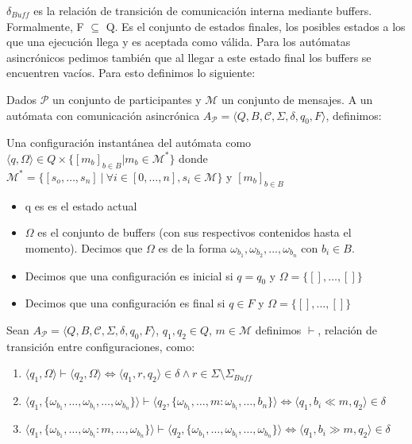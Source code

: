 $\delta_{Buff}$ es la relación de transición de comunicación interna mediante buffers.\\

Formalmente, F $\subseteq$ Q. Es el conjunto de estados finales, los posibles estados a los que una ejecución llega y es aceptada como válida. Para los autómatas asincrónicos pedimos también que al llegar a este estado final los buffers se encuentren vacíos. Para esto definimos lo siguiente:

\begin{definition}
Dados $\mathcal{P}$ un conjunto de participantes y $\mathcal{M}$ un conjunto de mensajes. A un autómata con comunicación asincrónica $A_\mathcal{P} = \langle Q, B, \mathcal{C}, \Sigma, \delta, q_0, F\rangle$, definimos:

Una configuración instantánea del autómata como $\langle q, \Omega \rangle \in Q \times \{ [m_b]_{b \in B} | m_b \in \mathcal{M}^* \}$ donde $\mathcal{M}^* = \{ [s_o, \ldots, s_n] \  | \ \forall i \in [0, \ldots, n], s_i \in \mathcal{M} \}$ y $[m_b]_{b \in B} $

\begin{itemize}
\item  q es es el estado actual
\item $\Omega$ es el conjunto de buffers (con sus respectivos contenidos hasta el momento). Decimos que $\Omega$ es de la forma ${ \omega_{b_1}, \omega_{b_2},..., \omega_{b_n} }$ con $b_i \in B$. 
\item Decimos que una configuración es inicial si $q = q_0$ y $ \Omega = \{ [], \ldots, [] \}$
\item Decimos que una configuración es final si $q \in F$ y $ \Omega = \{ [], \ldots, [] \}$
\end{itemize}
\end{definition}

\begin{definition}
\label{def:reltransAFCA}
Sean $A_\mathcal{P} = \langle Q, B, \mathcal{C}, \Sigma, \delta, q_0, F\rangle$, $q_1, q_2 \in Q$, $ m \in \mathcal{M}$ definimos $\vdash$, relación de transición entre configuraciones, como:  
\begin{enumerate}
\item $\langle q_1, \Omega \rangle \vdash \langle q_2, \Omega \rangle \iff \langle q_1,r, q_2 \rangle \in \delta \land r \in \Sigma \setminus \Sigma_\mathit{Buff}$

\item $\langle q_1 ,\{\omega_{b_1},\ldots,\omega_{b_i},\ldots,\omega_{b_n}\} \rangle \vdash \langle q_2,\{\omega_{b_1},\ldots,m : \omega_{b_i},\ldots,b_n\}\rangle \iff \langle q_1, b_i \ll m, q_2 \rangle  \in \delta $ 

\item $\langle q_1, \{\omega_{b_1},\ldots,\omega_{b_i} : m,\ldots,\omega_{b_n}\} \rangle \vdash \langle q_2, \{\omega_{b_1},\ldots,\omega_{b_i},\ldots,\omega_{b_n} \}\rangle \iff \langle q_1, b_i \gg m, q_2 \rangle \in \delta$
\end{enumerate}

\end{definition}

